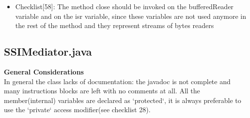 \documentclass[11pt,titlepage]{article} %
\begin{document}
\begin{itemize}
\begin{itemize}
     \item Checklist[58]:
      The method close should be invoked on the bufferedReader variable and on the
      isr variable, since these variables are not used anymore in the rest of the method
      and they represent streams of bytes readers
      

    \end{itemize}

  \end{itemize}


\subsection{SSIMediator.java}
  \textbf{General Considerations} \hfill \\
  In general the class lacks of documentation: the javadoc is not complete and many instructions blocks are left with no comments at all.\newline
  All the member(internal) variables are declared as `protected`, it is always preferable to use the `private` access modifier(see checklist 28). 
\end{document}
